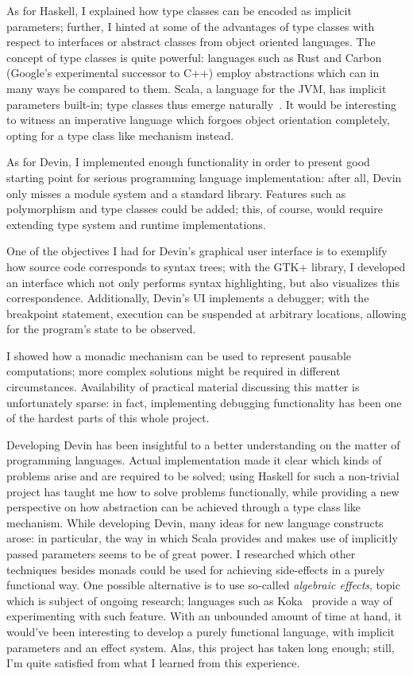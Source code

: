 \documentclass[UdineBachThesis,american,11pt]{PhdThesis}
\begin{document}
  As for Haskell, I explained how type classes can be encoded as implicit
  parameters; further, I hinted at some of the advantages of type classes with
  respect to interfaces or abstract classes from object oriented languages. The
  concept of type classes is quite powerful: languages such as Rust and Carbon
  (Google's experimental successor to C++) employ abstractions which can in many
  ways be compared to them. Scala, a language for the JVM, has implicit
  parameters built-in; type classes thus emerge
  naturally~\cite{scala-type-classes}. It would be interesting to witness an
  imperative language which forgoes object orientation completely, opting for a
  type class like mechanism instead.

  As for Devin, I implemented enough functionality in order to present good
  starting point for serious programming language implementation: after all,
  Devin only misses a module system and a standard library. Features such as
  polymorphism and type classes could be added; this, of course, would require
  extending type system and runtime implementations.

  One of the objectives I had for Devin's graphical user interface is to
  exemplify how source code corresponds to syntax trees; with the GTK+ library,
  I developed an interface which not only performs syntax highlighting, but also
  visualizes this correspondence. Additionally, Devin's UI implements a
  debugger; with the breakpoint statement, execution can be suspended at
  arbitrary locations, allowing for the program's state to be observed.

  I showed how a monadic mechanism can be used to represent pausable
  computations; more complex solutions might be required in different
  circumstances. Availability of practical material discussing this matter is
  unfortunately sparse: in fact, implementing debugging functionality has been
  one of the hardest parts of this whole project.

  \pagebreak

  Developing Devin has been insightful to a better understanding on the matter
  of programming languages. Actual implementation made it clear which kinds of
  problems arise and are required to be solved; using Haskell for such a
  non-trivial project has taught me how to solve problems functionally, while
  providing a new perspective on how abstraction can be achieved through a type
  class like mechanism. While developing Devin, many ideas for new language
  constructs arose: in particular, the way in which Scala provides and makes use
  of implicitly passed parameters seems to be of great power. I researched which
  other techniques besides monads could be used for achieving side-effects in a
  purely functional way. One possible alternative is to use so-called
  \emph{algebraic effects}, topic which is subject of ongoing research;
  languages such as Koka~\cite{koka} provide a way of experimenting with such
  feature. With an unbounded amount of time at hand, it would've been
  interesting to develop a purely functional language, with implicit parameters
  and an effect system. Alas, this project has taken long enough; still, I'm
  quite satisfied from what I learned from this experience.
\end{document}
